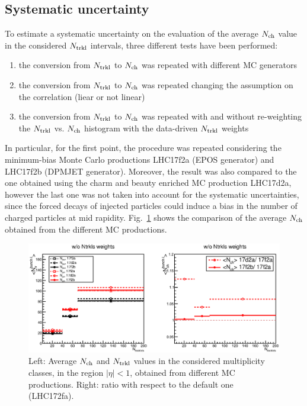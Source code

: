 \subsection{Systematic uncertainty}
\label{sec:NtrklToNchSyst}
To estimate a systematic uncertainty on the evaluation of the average 
$N_{\rm ch}$ value in the considered $N_{\rm trkl}$ intervals, three different tests have been performed:
\begin{enumerate}
\item the conversion from $N_{\rm trkl}$ to $N_{\rm ch}$ was repeated with different MC generators 
\item the conversion from $N_{\rm trkl}$ to $N_{\rm ch}$ was repeated changing the 
assumption on the correlation (liear or not linear)
\item the conversion from $N_{\rm trkl}$ to $N_{\rm ch}$ was repeated with and without 
re-weighting the $N_{\rm trkl}$ vs. $N_{\rm ch}$ histogram with the data-driven $N_{\rm trkl}$ weights
\end{enumerate}

In particular, for the first point, the procedure was repeated 
considering the minimum-bias Monte Carlo productions LHC17f2a 
(EPOS generator) and LHC17f2b (DPMJET generator). Moreover, 
the result was also compared to the one obtained using the charm 
and beauty enriched MC production LHC17d2a, however the last one 
was not taken into account for the systematic uncertainties, since the 
forced decays of injected particles could induce a bias in the number 
of charged particles at mid rapidity. Fig.~\ref{fig:NchVsMCgenerator} 
shows the comparison of the average $N_{\rm ch}$ obtained from the different MC productions.

\begin{figure}[htpb]
\centering
 \includegraphics[width=.9\textwidth]{FigCap6/comparisonNtrkl_17f2b_17d2a_17f2a.eps}
 \caption{Left: Average $N_{\rm ch}$ and $N_{\rm trkl}$ values in the considered multiplicity classes, in the region $|\eta |< 1$, obtained from different MC productions. Right: ratio with respect to the default one (LHC172fa).}
 \label{fig:NchVsMCgenerator}
 \end{figure}

